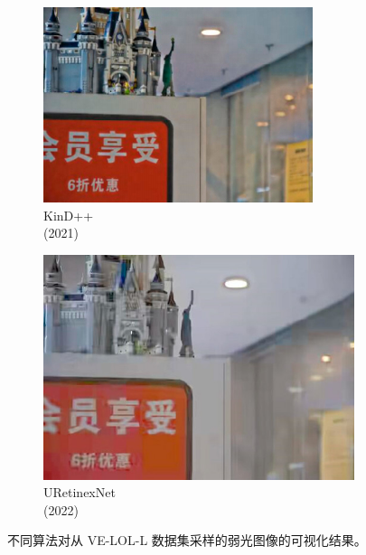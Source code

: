 \documentclass[a4paper]{ctexart}
\begin{document}
\begin{figure}[htbp]
\begin{subfigure}{0.17\columnwidth}
			\includegraphics[width=\linewidth]{picture/LLIE/VE-LOL-L/KinD++}
			\captionsetup{font=scriptsize}
			\caption*{KinD++ \\ (2021)}
			\label{fig: KinD++}	
		\end{subfigure}
		\begin{subfigure}{0.17\columnwidth}
			\includegraphics[width=\linewidth]{picture/LLIE/VE-LOL-L/URetinexNet}
			\captionsetup{font=scriptsize}
			\caption*{URetinexNet \\ (2022)}
			\label{fig: URetinexNet}	
		\end{subfigure}
		\caption{
			\label{fig: VE-LOL-L Visual} 
			不同算法对从 VE-LOL-L 数据集采样的弱光图像的可视化结果。 
		}
	\end{figure}
	
\end{document}
